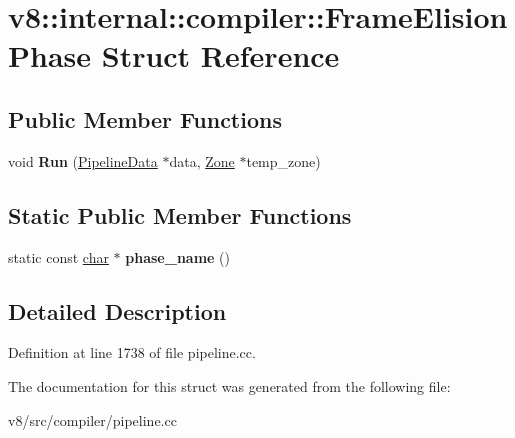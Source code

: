 \hypertarget{structv8_1_1internal_1_1compiler_1_1FrameElisionPhase}{}\section{v8\+:\+:internal\+:\+:compiler\+:\+:Frame\+Elision\+Phase Struct Reference}
\label{structv8_1_1internal_1_1compiler_1_1FrameElisionPhase}
\subsection*{Public Member Functions}
\begin{DoxyCompactItemize}
\item 
\mbox{\label{structv8_1_1internal_1_1compiler_1_1FrameElisionPhase_a8e7f6405822771ab97a6f07fd2a576fd}} 
void {\bfseries Run} (\mbox{\hyperlink{classv8_1_1internal_1_1compiler_1_1PipelineData}{Pipeline\+Data}} $\ast$data, \mbox{\hyperlink{classv8_1_1internal_1_1Zone}{Zone}} $\ast$temp\+\_\+zone)
\end{DoxyCompactItemize}
\subsection*{Static Public Member Functions}
\begin{DoxyCompactItemize}
\item 
\mbox{\label{structv8_1_1internal_1_1compiler_1_1FrameElisionPhase_a111eaecc3740e63fd7024b0c0d76c474}} 
static const \mbox{\hyperlink{classchar}{char}} $\ast$ {\bfseries phase\+\_\+name} ()
\end{DoxyCompactItemize}


\subsection{Detailed Description}


Definition at line 1738 of file pipeline.\+cc.



The documentation for this struct was generated from the following file\+:\begin{DoxyCompactItemize}
\item 
v8/src/compiler/pipeline.\+cc\end{DoxyCompactItemize}
